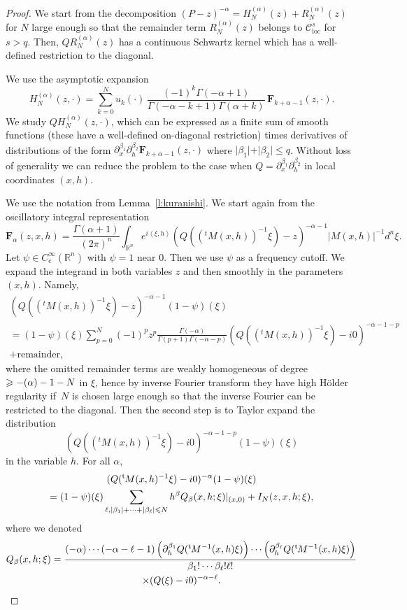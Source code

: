 \documentclass[JEP,XML,SOM,Unicode]{cedram}
\let\pazocal\mathscr
\theoremstyle{definition}
\renewcommand\c{\mathrm{c}}
\newcommand\loc{\mathrm{loc}}
\let\cv\alpha
\let\varm k
\let\Re\relax
\DeclareMathOperator{\Re}{Re}
\renewcommand{\t}{{{}^{\mathrm{t}\mkern-2mu}}}
\begin{document}
\begin{proof}
We start from the decomposition
$(P-z)^{-\cv}=H_N^{(\cv)}(z)+R_N^{(\cv)}(z)$ for $N$ large enough so that the remainder term $R_N^{(\cv)}(z)$ belongs to $\pazocal{C}^{s}_{\loc}$ for $s>q$. Then, $QR_N^{(\cv)}(z)$ has a continuous Schwartz kernel which has a well-defined restriction to the diagonal.

We use the asymptotic expansion
\[
H_N^{(\cv)}(z,\cdot) =
\sum_{\varm=0}^N u_\varm(\cdot)\,\frac{(-1)^\varm\Gamma(-\cv+1)}{\Gamma(-\cv-\varm+1)\Gamma(\cv+\varm)}\, \mathbf{F}_{\varm+\cv-1}(z,\cdot).
\]
We study $QH_N^{(\cv)}(z,\cdot)$, which can be expressed as a finite sum of smooth functions (these have a well-defined on-diagonal restriction)
times derivatives of distributions of the form
$\partial_x^{\beta_1}\partial_h^{\beta_2} \mathbf{F}_{\varm+\cv-1}(z,\cdot)$ where $\vert\beta_1\vert+\vert\beta_2\vert\leqslant q$.
Without loss of generality we can reduce the problem to the case when
$Q=\partial_x^{\beta_1}\partial_h^{\beta_2}$ in local coordinates $(x,h)$.

We use the notation from Lemma~\ref{l:kuranishi}.
We start again from the oscillatory integral representation\vspace*{-3pt}
\[
\mathbf{F}_\cv(z,x,h)=\frac{\Gamma(\cv+1)}{(2\pi)^n}\int_{\mathbb{R}^n} e^{i\left\langle \xi,h\right\rangle} \left(Q((^tM(x,h))^{-1}\xi)-z \right)^{-\cv-1}\vert M(x,h) \vert^{-1}d^n\xi.
\]
Let $\psi\in C^\infty_\c(\mathbb{R}^n)$ with $\psi=1$ near $0$. Then we use $\psi$ as a frequency cutoff.
We expand the integrand in both variables $z$ and then smoothly in the parameters $(x,h)$. Namely,
\begin{multline*}
\left(Q((^tM(x,h))^{-1}\xi)-z \right)^{-\cv-1}(1-\psi)(\xi)\\
=(1-\psi)(\xi)\sum_{p=0}^N (-1)^pz^p \frac{\Gamma(-\cv)}{\Gamma(p+1)\Gamma(-\cv-p)} \left(Q((^tM(x,h))^{-1}\xi)-i0 \right)^{-\cv-1-p}\\
+ \text{remainder},
\end{multline*}
where the omitted remainder terms are weakly homogeneous of
degree $\geqslant -\Re(\cv)\allowbreak-1-\nobreak N$ in $\xi$, hence by inverse Fourier transform
they have high Hölder regularity if~$N$ is chosen large enough so that the inverse Fourier can be restricted to the diagonal.
Then the second step is to Taylor expand the distribution
\[
\left(Q((^tM(x,h))^{-1}\xi)-i0 \right)^{-\cv-1-p}(1-\psi)(\xi)
\]
in the variable $h$.
For all $\cv$,
\begin{multline*}
(Q(\t M(x, h)^{-1}\xi)-i0)^{-\cv}(1-\psi)(\xi) \\
=(1-\psi)(\xi)\sum_{\ell, \vert \beta_1\vert+\dots+\vert\beta_\ell\vert\leqslant N} h^\beta Q_\beta(x,h;\xi)
|_{(x,0)}+I_N(z,x,h;\xi),
\end{multline*}
where we denoted
\begin{multline*}
Q_\beta(x,h;\xi) = \frac{(-\cv)\cdots(-\cv-\ell-1) \left(\partial_h^{\beta_1}Q(\t M^{-1}(x,h)\xi)\right)\cdots
\left(\partial_h^{\beta_\ell}Q(\t M^{-1}(x,h)\xi)\right) }{\beta_1!\cdots\beta_\ell!\ell!}
\\ \times (Q(\xi)-i0)^{-\cv-\ell}.
\end{multline*}


\end{proof}
\end{document}
